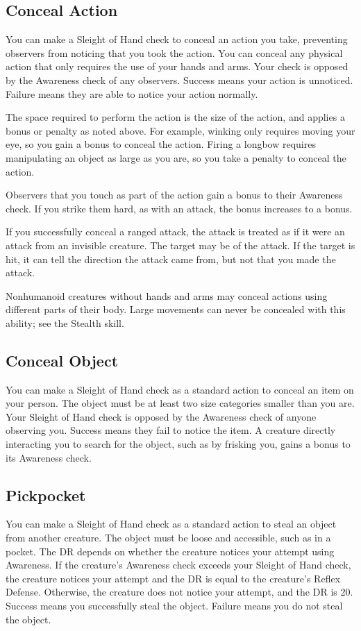     \subsection{Conceal Action}
        You can make a Sleight of Hand check to conceal an action you take, preventing observers from noticing that you took the action. You can conceal any physical action that only requires the use of your hands and arms. Your check is opposed by the Awareness check of any observers. Success means your action is unnoticed. Failure means they are able to notice your action normally.

        The space required to perform the action is the size of the action, and applies a bonus or penalty as noted above. For example, winking only requires moving your eye, so you gain a  bonus to conceal the action. Firing a longbow requires manipulating an object as large as you are, so you take a  penalty to conceal the action.

        Observers that you touch as part of the action gain a  bonus to their Awareness check. If you strike them hard, as with an attack, the bonus increases to a  bonus.

        If you successfully conceal a ranged attack, the attack is treated as if it were an attack from an invisible creature. The target may be \unaware of the attack. If the target is hit, it can tell the direction the attack came from, but not that you made the attack.

        Nonhumanoid creatures without hands and arms may conceal actions using different parts of their body. Large movements can never be concealed with this ability; see the Stealth skill.

    \subsection{Conceal Object}
        You can make a Sleight of Hand check as a standard action to conceal an item on your person. The object must be at least two size categories smaller than you are. Your Sleight of Hand check is opposed by the Awareness check of anyone observing you. Success means they fail to notice the item. A creature directly interacting you to search for the object, such as by frisking you, gains a  bonus to its Awareness check.

    \subsection{Pickpocket}
        You can make a Sleight of Hand check as a standard action to steal an object from another creature. The object must be loose and accessible, such as in a pocket. The DR depends on whether the creature notices your attempt using Awareness. If the creature's Awareness check exceeds your Sleight of Hand check, the creature notices your attempt and the DR is equal to the creature's Reflex Defense. Otherwise, the creature does not notice your attempt, and the DR is 20. Success means you successfully steal the object. Failure means you do not steal the object.

